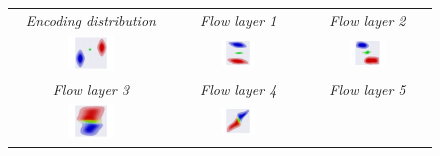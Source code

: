 \begin{figure}[b!]
    \centering
    \begin{tabular}{ccc}
        \textit{Encoding distribution} &
        \textit{Flow layer 1} & 
        \textit{Flow layer 2} \\
        \includegraphics[width=0.3\textwidth]{figures/experiments_figures/latent_space/graph_coloring/layer_forward_01.pdf} & 
        \includegraphics[width=0.3\textwidth]{figures/experiments_figures/latent_space/graph_coloring/layer_forward_04.pdf}  & 
        \includegraphics[width=0.3\textwidth]{figures/experiments_figures/latent_space/graph_coloring/layer_forward_07.pdf}
        \\[0.4cm]
        \textit{Flow layer 3} &
        \textit{Flow layer 4} & 
        \textit{Flow layer 5} \\
        \includegraphics[width=0.3\textwidth]{figures/experiments_figures/latent_space/graph_coloring/layer_forward_10.pdf} & 
        \includegraphics[width=0.3\textwidth]{figures/experiments_figures/latent_space/graph_coloring/layer_forward_13.pdf}  & 

\end{tabular}
\end{figure}

